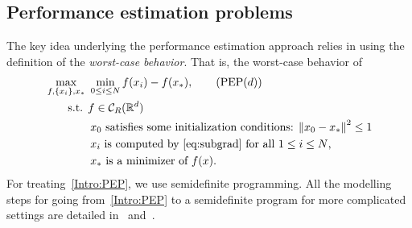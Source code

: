 \documentclass[11pt,a4paper]{article}
\newcommand{\normsq}[1]{{\left\lVert#1\right\rVert}^2}
\newcommand{\Rd}{\mathbb{R}^d}
\begin{document}
\subsection{Performance estimation problems}
The key idea underlying the performance estimation approach relies in using the definition of the \emph{worst-case behavior}. That is, the worst-case behavior of
\begin{align}
&\max_{f,\{x_i\},x_*} \ \min_{0\leq i\leq N} f(x_i)-f(x_*),  \tag{PEP$(d)$}\label{Intro:PEP} \\
&\quad\quad \text{s.t. } f\in \mathcal{C}_R(\Rd)  \notag\\
&\quad\quad\quad\quad    x_0 \text{ satisfies some initialization conditions: } \normsq{x_0-x_*}\leq 1\notag \\
&\quad\quad\quad\quad    x_{i} \text{ is computed by~\eqref{eq:subgrad} for all $1 \le i \le N$,} 
\notag\\
&\quad\quad\quad\quad    x_* \text{ is a minimizer of } f(x). \notag
\end{align}
For treating~\eqref{Intro:PEP}, we use semidefinite programming. All the modelling steps for going from~\eqref{Intro:PEP} to a semidefinite program for more complicated settings are detailed in~\cite{taylor2015smooth} and~\cite{taylor2015exact}. 
\end{document}
